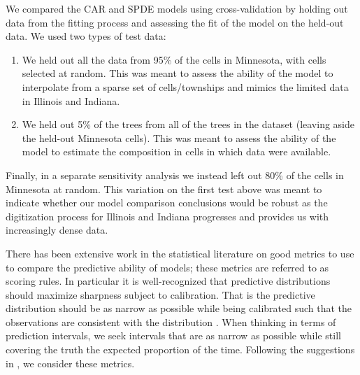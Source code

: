 \documentclass[12pt]{article}\usepackage[]{graphicx}\usepackage[]{color}
\begin{document}
We compared the CAR and SPDE models using cross-validation by holding
out data from the fitting process and assessing the fit of the model
on the held-out data. We used two types of test data:
\begin{enumerate}
\item We held out all the data from 95\% of the cells in Minnesota, with
cells selected at random. This was meant to assess the ability of
the model to interpolate from a sparse set of cells/townships and
mimics the limited data in Illinois and Indiana.
\item We held out 5\% of the trees from all of the trees in the dataset
(leaving aside the held-out Minnesota cells). This was meant to assess
the ability of the model to estimate the composition in cells in which
data were available. 
\end{enumerate}
Finally, in a separate sensitivity analysis we instead left out 80\%
of the cells in Minnesota at random. This variation on the first test
above was meant to indicate whether our model comparison conclusions
would be robust as the digitization process for Illinois and Indiana
progresses and provides us with increasingly dense data.

There has been extensive work in the statistical literature on good
metrics to use to compare the predictive ability of models; these
metrics are referred to as scoring rules. In particular it is well-recognized
that predictive distributions should maximize sharpness subject to
calibration. That is the predictive distribution should be as narrow
as possible while being calibrated such that the observations are
consistent with the distribution \citep{Gnei:etal:2007}. When thinking
in terms of prediction intervals, we seek intervals that are as narrow
as possible while still covering the truth the expected proportion
of the time. Following the suggestions in \citep{Gnei:etal:2007},
we consider these metrics.
\end{document}
